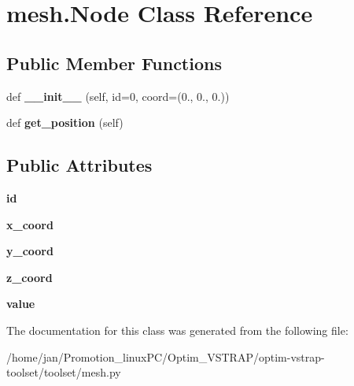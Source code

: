 \hypertarget{classmesh_1_1Node}{}\section{mesh.\+Node Class Reference}
\label{classmesh_1_1Node}
\subsection*{Public Member Functions}
\begin{DoxyCompactItemize}
\item 
\mbox{\label{classmesh_1_1Node_a3217d462af12c56ef6ada880de4a478f}} 
def {\bfseries \+\_\+\+\_\+init\+\_\+\+\_\+} (self, id=0, coord=(0., 0., 0.))
\item 
\mbox{\label{classmesh_1_1Node_a96903bf25e248be9051c9f0aa3772fd7}} 
def {\bfseries get\+\_\+position} (self)
\end{DoxyCompactItemize}
\subsection*{Public Attributes}
\begin{DoxyCompactItemize}
\item 
\mbox{\label{classmesh_1_1Node_ad8e114d00c3d58afe2cfc0faf8460563}} 
{\bfseries id}
\item 
\mbox{\label{classmesh_1_1Node_a327f78d3114ec42494d876bb17dfb069}} 
{\bfseries x\+\_\+coord}
\item 
\mbox{\label{classmesh_1_1Node_a27250f449af1f16d9f50c5dfca7f93cf}} 
{\bfseries y\+\_\+coord}
\item 
\mbox{\label{classmesh_1_1Node_a8c3a747344f22f916f76f35586645fd0}} 
{\bfseries z\+\_\+coord}
\item 
\mbox{\label{classmesh_1_1Node_a64b90f8937228522c25eada3fbfc3f05}} 
{\bfseries value}
\end{DoxyCompactItemize}


The documentation for this class was generated from the following file\+:\begin{DoxyCompactItemize}
\item 
/home/jan/\+Promotion\+\_\+linux\+P\+C/\+Optim\+\_\+\+V\+S\+T\+R\+A\+P/optim-\/vstrap-\/toolset/toolset/mesh.\+py\end{DoxyCompactItemize}
